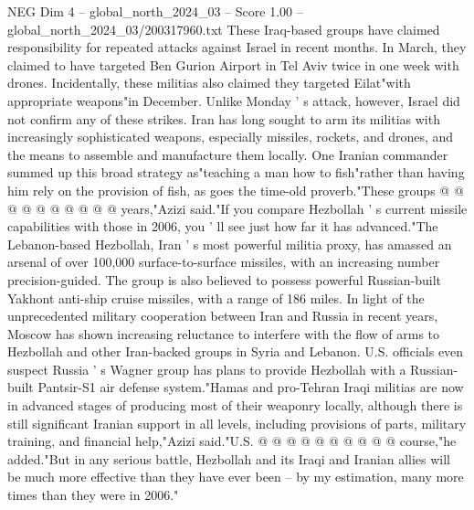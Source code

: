 \begin{textsample}{NEG Dim 4 – global\_north\_2024\_03 – Score 1.00 – global\_north\_2024\_03/200317960.txt}
These Iraq-based groups have claimed responsibility for repeated attacks against Israel in recent months.
In March, they claimed to have targeted Ben Gurion Airport in Tel Aviv twice in one week with drones.
Incidentally, these militias also claimed they targeted Eilat"with appropriate weapons"in December.
Unlike Monday ' s attack, however, Israel did not confirm any of these strikes.
Iran has long sought to arm its militias with increasingly sophisticated weapons, especially missiles, rockets, and drones, and the means to assemble and manufacture them locally.
One Iranian commander summed up this broad strategy as"teaching a man how to fish"rather than having him rely on the provision of fish, as goes the time-old proverb."These groups @ @ @ @ @ @ @ @ @ @ years,"Azizi said."If you compare Hezbollah ' s current missile capabilities with those in 2006, you ' ll see just how far it has advanced."The Lebanon-based Hezbollah, Iran ' s most powerful militia proxy, has amassed an arsenal of over 100,000 surface-to-surface missiles, with an increasing number precision-guided.
The group is also believed to possess powerful Russian-built Yakhont anti-ship cruise missiles, with a range of 186 miles.
In light of the unprecedented military cooperation between Iran and Russia in recent years, Moscow has shown increasing reluctance to interfere with the flow of arms to Hezbollah and other Iran-backed groups in Syria and Lebanon.
U.S. officials even suspect Russia ' s Wagner group has plans to provide Hezbollah with a Russian-built Pantsir-S1 air defense system."Hamas and pro-Tehran Iraqi militias are now in advanced stages of producing most of their weaponry locally, although there is still significant Iranian support in all levels, including provisions of parts, military training, and financial help,"Azizi said."U.S. @ @ @ @ @ @ @ @ @ @ course,"he added."But in any serious battle, Hezbollah and its Iraqi and Iranian allies will be much more effective than they have ever been -- by my estimation, many more times than they were in 2006."

\end{textsample}
